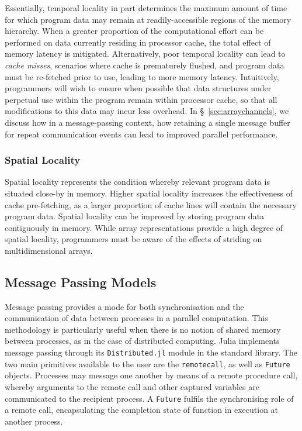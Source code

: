 \documentclass{juliacon}
\begin{document}
Essentially, temporal locality in part determines the maximum amount of
time for which program data may remain at readily-accessible regions of
the memory hierarchy. When a greater proportion of the computational
effort can be performed on data currently residing in processor cache,
the total effect of memory latency is mitigated. Alternatively, poor
temporal locality can lead to \emph{cache misses}, scenarios where cache
is prematurely flushed, and program data must be re-fetched prior to use,
leading to more memory latency. Intuitively, programmers will wish to
ensure when possible that data structures under perpetual use within the
program remain within processor cache, so that all modifications to this
data may incur less overhead. In \S~\ref{sec:arraychannels}, we
discuss how in a message-passing context, how retaining a single message
buffer for repeat communication events can lead to improved parallel
performance.

\subsubsection{Spatial Locality}
\label{sec:spatial-locality}

Spatial locality represents the condition whereby relevant program data is situated close-by in memory. Higher spatial locality increases the effectiveness of cache pre-fetching, as a larger proportion of cache lines will contain the necessary program data. Spatial locality can be improved by storing program data contiguously in memory. While array representations provide a high degree of spatial locality, programmers
must be aware of the effects of striding on multidimensional arrays.

\subsection{Message Passing Models}
\label{sec:message-passing}

Message passing provides a mode for both synchronisation and the
communication of data between processes in a parallel computation. This
methodology is particularly useful when there is no notion of shared
memory between processes, as in the case of distributed computing. Julia
implements message passing through its \texttt{Distributed.jl} module in
the standard library. The two main primitives available to the user are the
\texttt{remotecall}, as well as \texttt{Future} objects. Processes may message
one another by means of a remote procedure call, whereby arguments to
the remote call and other captured variables are communicated to the
recipient process. A \texttt{Future} fulfils the synchronising role of
a remote call, encapsulating the completion state of function in
execution at another process.
\end{document}
